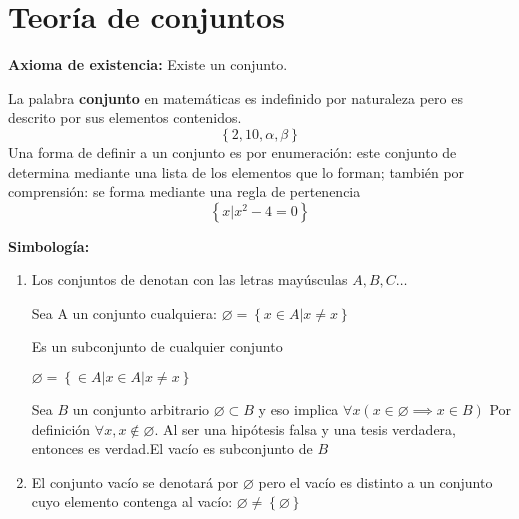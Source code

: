 \section{Teoría de conjuntos}

\textbf{Axioma de existencia:} Existe un conjunto.

La palabra \textbf{conjunto} en matemáticas es indefinido por naturaleza
pero es descrito por sus elementos contenidos.
\begin{equation*}
	\left \{2,10,\alpha , \beta \right \}
\end{equation*}
Una forma de definir a un conjunto es por enumeración: este conjunto de determina mediante una lista de los elementos que lo forman; también por comprensión: se forma mediante una regla de pertenencia
\begin{equation*}
	\left\{ x \vert  x^2 -4=0 \right\}
\end{equation*}

\textbf{Simbología:}
\begin{enumerate}
	\item Los conjuntos de denotan con las letras mayúsculas $A,B,C\ldots$

	      \begin{definition}[vacío]
		      Sea A un conjunto cualquiera: $\varnothing = \left\{ x \in A | x \neq x \right\}$
	      \end{definition}

	      \begin{theorem}
		      Es un subconjunto de cualquier conjunto

		      $\varnothing = \left\{ \in A | x \in A | x \neq x \right\} $
	      \end{theorem}

	      \begin{exercise}
		      Sea $B$ un conjunto arbitrario $\varnothing \subset B$
		      y eso implica $\forall x (x \in \varnothing \implies x \in B)$ Por definición $\forall x, x\notin \varnothing$. Al ser una hipótesis falsa y una tesis verdadera, entonces es verdad.El vacío es subconjunto de $B$
	      \end{exercise}

	\item El conjunto vacío se denotará por $\varnothing$ pero el vacío
	      es distinto a un conjunto cuyo elemento contenga al vacío: $\varnothing \neq  \left\{ \varnothing \right\} $

\end{enumerate}


